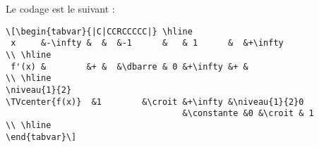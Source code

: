 \documentclass[a4paper,11pt]{article}
\begin{document}
\enlargethispage*{.5\baselineskip}
Le codage est le suivant :
\vspace{-.3\baselineskip}
{\footnotesize
\begin{verbatim}
\[\begin{tabvar}{|C|CCRCCCCC|} \hline
 x     &-\infty &  &  &-1      &   & 1      &  &+\infty
\\ \hline
 f'(x) &        &+ &  &\dbarre & 0 &+\infty &+ &
\\ \hline
\niveau{1}{2}
\TVcenter{f(x)}  &1        &\croit &+\infty &\niveau{1}{2}0 
                                   &\constante &0 &\croit & 1
\\ \hline
\end{tabvar}\]
\end{verbatim}
}
\end{document}
